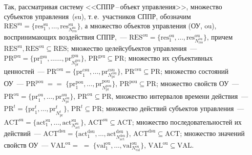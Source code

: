 \begin{multicols}{2}
  Так, рассматривая систему <<СППР\,--\,объект управления>>, множество 
субъектов управления~(su), т.\,е.\ участников СППР, обозначим $\mathrm{RES}^{\mathrm{su}} 
=\{\mathrm{res}_1^{\mathrm{su}}, \ldots , \mathrm{res}^{\mathrm{su}}_{N_{\mathrm{res}}^{\mathrm{su}}}\}$, 
а множество объектов 
управления (ОУ, ou), воспринимающих воздействия СППР,~--- $\mathrm{RES}^{\mathrm{ou}} 
=\{\mathrm{res}_1^{\mathrm{ou}}, \ldots , \mathrm{res}^{\mathrm{ou}}_{N_{\mathrm{res}}^{\mathrm{ou}}}\}$, 
причем $\mathrm{RES}^{\mathrm{su}}, 
\mathrm{RES}^{\mathrm{ou}}\subseteq \mathrm{RES}$; множество целей\linebreak субъектов управления~---
$\mathrm{PR}^{\mathrm{gsu}} = \{\mathrm{pr}_1^{\mathrm{gsu}},\ldots$\linebreak $\ldots , \mathrm{pr}^{\mathrm{gsu}}_{N_{\mathrm{pr}}^{\mathrm{gsu}}}\}$, 
$\mathrm{PR}^{\mathrm{gsu}}\subseteq \mathrm{PR}$; 
множество их субъективных ценностей~--- $\mathrm{PR}^{\mathrm{csu}} =\{\mathrm{pr}_1^{\mathrm{csu}}, \ldots , 
\mathrm{pr}^{\mathrm{csu}}_{N_{\mathrm{pr}}^{\mathrm{csu}}}\}$, $\mathrm{PR}^{\mathrm{csu}}\subseteq \mathrm{PR}$; 
множество состояний 
ОУ~--- $\mathrm{PR}^{\mathrm{pou}}\;=$\linebreak $=\;\{\mathrm{pr}_1^{\mathrm{pou}}, \ldots , \mathrm{pr}^{\mathrm{pou}}_{N_{\mathrm{pr}}^{\mathrm{pou}}}\}$, 
$\mathrm{PR}^{\mathrm{pou}}\subseteq \mathrm{PR}$; множество свойств ОУ~--- 
$\mathrm{PR}^{\mathrm{ou}} =\{\mathrm{pr}_1^{\mathrm{ou}}, \ldots , 
\mathrm{pr}^{\mathrm{ou}}_{N_{\mathrm{pr}}^{\mathrm{ou}}}\}$, 
$\mathrm{PR}^{\mathrm{ou}}\subseteq  \mathrm{PR}$, множество интервалов времени действия~--- 
$\mathrm{PR}^t = \{\mathrm{pr}_1^t, \ldots , \mathrm{pr}^t_{N^t_{\mathrm{pr}}}\}$, 
$\mathrm{PR}^t\subseteq \mathrm{PR}$; множество действий субъектов управ\-ле\-ния~--- 
$\mathrm{ACT}^{\mathrm{su}} =\{\mathrm{act}_1^{\mathrm{su}}, \ldots , \mathrm{act}^{\mathrm{su}}_{N^{\mathrm{su}}_{\mathrm{act}}}\}$, 
$\mathrm{ACT}^{\mathrm{su}}\subseteq \mathrm{ACT}$; множество последовательностей их действий~--- 
$\mathrm{ACT}^{\mathrm{dsu}} =\{\mathrm{act}_1^{\mathrm{dsu}}, \ldots , \mathrm{act}^{\mathrm{dsu}}_{N^{\mathrm{dsu}}_{\mathrm{act}}}\}$, 
$\mathrm{ACT}^{\mathrm{dsu}}\subseteq \mathrm{ACT}$; множество значений свойств ОУ~--- $\mathrm{VAL}^{\mathrm{ou}} 
=$\linebreak 
$=\;\{ \mathrm{val}_1^{\mathrm{ou}}, \ldots , \mathrm{val}_{N^{\mathrm{ou}}_{\mathrm{val}}}^{\mathrm{ou}}\}$, 
$\mathrm{VAL}^{\mathrm{ou}}\subseteq \mathrm{VAL}$.
  

\end{multicols}
